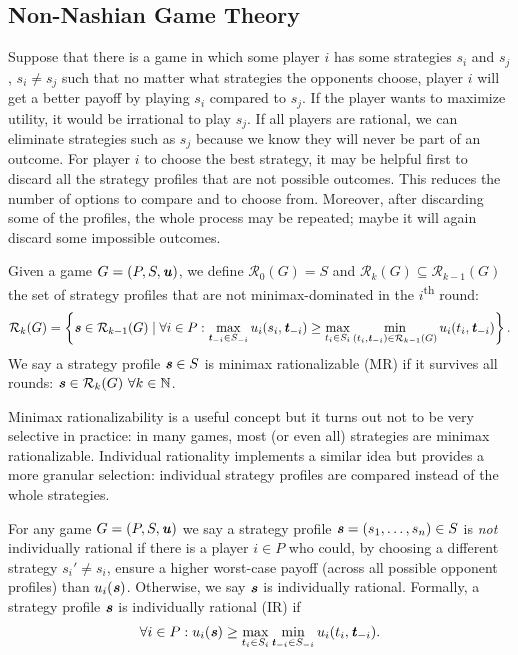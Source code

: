 \subsection{Non-Nashian Game Theory}
Suppose that there is a game in which some player $i$ has some strategies $s_i$ and $s_j$, $s_i \ne s_j$ such that no matter what strategies the opponents choose, player $i$ will get a better payoff by playing $s_i$ compared to $s_j$.
If the player wants to maximize utility, it would be irrational to play $s_j$.
If all players are rational, we can eliminate strategies such as $s_j$ because we know they will never be part of an outcome.
For player $i$ to choose the best strategy, it may be helpful first to discard all the strategy profiles that are not possible outcomes.
This reduces the number of options to compare and to choose from.
Moreover, after discarding some of the profiles, the whole process may be repeated; maybe it will again discard some impossible outcomes.

\begin{definition}
  Given a game $G = (P, S, \boldsymbol{\mathit{u}})$, we define $\mathcal{R}_0(G) = S$ and $\mathcal{R}_k(G) \subseteq \mathcal{R}_{k-1}(G)$ the set of strategy profiles that are not minimax-dominated in the $i$\textsuperscript{th} round:
  \[
    \mathcal{R}_k(G) = \left\{\boldsymbol{\mathit{s}} \in \mathcal{R}_{k-1}(G) \mid \forall i \in P: \max_{\boldsymbol{\mathit{t}}_{-i} \in S_{-i}}u_i(s_i, \boldsymbol{\mathit{t}}_{-i}) \ge \max_{t_i \in S_i}\min_{(t_i, \boldsymbol{\mathit{t}}_{-i}) \in \mathcal{R}_{k-1}(G)}u_i(t_i, \boldsymbol{\mathit{t}}_{-i})\right\}.
  \]
  We say a strategy profile $\boldsymbol{\mathit{s}} \in S$ is minimax rationalizable (MR) if it survives all rounds: $\boldsymbol{\mathit{s}} \in \mathcal{R}_k(G)\ \forall k \in \mathbb{N}$.
\end{definition}

Minimax rationalizability is a useful concept but it turns out not to be very selective in practice: in many games, most (or even all) strategies are minimax rationalizable.
Individual rationality implements a similar idea but provides a more granular selection: individual strategy profiles are compared instead of the whole strategies.

\begin{definition}
  For any game $G = (P, S, \boldsymbol{\mathit{u}})$ we say a strategy profile $\boldsymbol{\mathit{s}} = (s_1, \dots, s_n) \in S$ is \textit{not} individually rational if there is a player $i \in P$ who could, by choosing a different strategy $s_i' \ne s_i$, ensure a higher worst-case payoff (across all possible opponent profiles) than $u_i(\boldsymbol{\mathit{s}})$.
  Otherwise, we say $\boldsymbol{\mathit{s}}$ is individually rational.
  Formally, a strategy profile $\boldsymbol{\mathit{s}}$ is individually rational (IR) if
  \[
    \forall i \in P: u_i(\boldsymbol{\mathit{s}}) \ge \max_{t_i\in S_i}\min_{\boldsymbol{\mathit{t}}_{-i} \in S_{-i}}u_i(t_i, \boldsymbol{\mathit{t}}_{-i}).
  \]
\end{definition}

